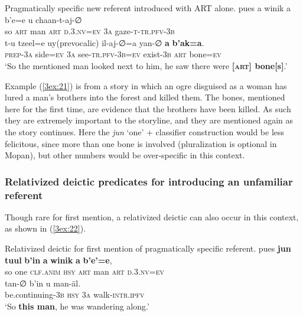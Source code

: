 \documentclass[output=paper]{langsci/langscibook}
\begin{document}
\begin{exe}
\ex\label{3ex:21}
Pragmatically specific new referent introduced with ART alone. 
\exi{}
\gll	pues	a 	winik	a 	b’e=e 			u 		chaan-t-aj-∅  \\
	so	{\textsc{art}}	man	{\textsc{art}}	{\textsc{d.3.nv=ev}}		{\textsc{3a}}	gaze-{\textsc{t-tr.pfv-3b}} \\
\glt
\exi{}
\gll	t-u  			tzeel=e 		uy(prevocalic) 	il-aj-∅=a  yan-{∅} 		{\textbf{a}} 	{\textbf{b'ak=a}}.\\
	{\textsc{prep-3a}}	side={\textsc{ev}} 	{\textsc{3a}} 		see-{\textsc{tr.pfv-3b=ev}}  exist-{\textsc{3b}} 	{\textsc{art}}		bone={\textsc{ev}} \\
\glt	`So the mentioned man looked next to him, he saw there were {\textbf{[{\textsc{art}}] bone[s]}}.'
\end{exe}

Example (\ref{3ex:21}) is from a story in which an ogre disguised as a woman has lured a man's brothers into the forest and killed them.  The bones, mentioned here for the first time, are evidence that the brothers have been killed. As such they are extremely important to the storyline, and they are mentioned again as the story continues.  Here the {\emph{jun}} `one' + classifier construction would be less felicitous, since more than one bone is involved (pluralization is optional in Mopan), but other numbers would be over-specific in this context.  


\subsubsection{Relativized deictic predicates for introducing an unfamiliar referent}\label{3sec:332}

Though rare for first mention, a relativized deictic can also occur in this context, as shown in (\ref{3ex:22}).

\begin{exe}
\ex\label{3ex:22}
Relativized deictic for first mention of pragmatically specific referent. 
\exi{}
\gll	pues 	{\textbf{jun}} 	{\textbf{tuul}} 		{\textbf{b'in}} 		{\textbf{a}} 	{\textbf{winik}} 	{\textbf{a}}	{\textbf{b'e'=e}}, \\
	so		one		{\textsc{clf.anim}}	{\textsc{hsy}}		{\textsc{art}}	man			{\textsc{art}}	{\textsc{d.3.nv=ev}} \\
\glt
\exi{}
\gll	tan-{∅} 				b'in 			u 		man-\"al. \\
	be.continuing-{\textsc{3b}}	{\textsc{hsy}}		{\textsc{3a}}	walk-{\textsc{intr.ipfv}} \\
\glt	`So {\textbf{this man}}, he was wandering along.'
\end{exe}
\end{document}
